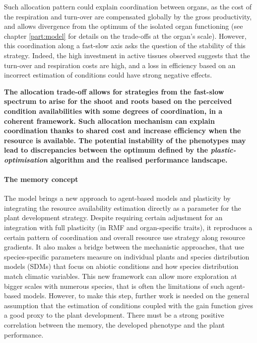 Such allocation pattern could explain coordination between organs, as the cost of the respiration and turn-over are compensated globally by the gross productivity, and allows divergence from the optimum of the isolated organ functioning (see chapter \ref{part:model} for details on the trade-offs at the organ's scale). However, this coordination along a fast-slow axis asks the question of the stability of this strategy. Indeed, the high investment in active tissues observed suggests that the turn-over and respiration costs are high, and a loss in efficiency based on an incorrect estimation of conditions could have strong negative effects. 



\textbf{The allocation trade-off allows for strategies from the fast-slow spectrum to arise for the shoot and roots based on the perceived condition availabilities with some degrees of coordination, in a coherent framework. Such allocation mechanism can explain coordination thanks to shared cost and increase efficiency when the resource is available. The potential instability of the phenotypes may lead to discrepancies between the optimum defined by the \textit{plastic-optimisation} algorithm and the realised performance landscape. }

\paragraph{The memory concept}

The model \model brings a new approach to agent-based models and plasticity by integrating the resource availability estimation directly as a parameter for the plant development strategy. Despite requiring certain adjustment for an integration with full plasticity (in RMF and organ-specific traits), it reproduces a certain pattern of coordination and overall resource use strategy along resource gradients. It also makes a bridge between the mechanistic approaches, that use species-specific parameters measure on individual plants and species distribution models (SDMs) that focus on abiotic conditions and how species distribution match climatic variables. This new framework can allow more exploration at bigger scales with numerous species, that is often the limitations of such agent-based models. However, to make this step, further work is needed on the general assumption that the estimation of conditions coupled with the gain function gives a good proxy to the plant development. There must be a strong positive correlation between the memory, the developed phenotype and the plant performance. 

